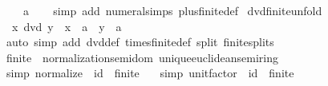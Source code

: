 \begin{isabellebody}
\ \ {\isachardoublequoteopen}{}\ {\isacharequal}{\kern0pt}\ a\isanewline
%
\isadelimproof
\ \ %
\endisadelimproof
%
\isatagproof
{}\isamarkupfalse%
\ {\isacharparenleft}{\kern0pt}simp\ add{\isacharcolon}{\kern0pt}\ numeral{\isachardot}{\kern0pt}simps\ plus{\isacharunderscore}{\kern0pt}finite{\isacharunderscore}{\kern0pt}{}{\isacharunderscore}{\kern0pt}def{\isacharparenright}{\kern0pt}%
\endisatagproof
{\isafoldproof}%
%
\isadelimproof
\isanewline
%
\endisadelimproof
\isanewline
{}\isamarkupfalse%
\ dvd{\isacharunderscore}{\kern0pt}finite{\isacharunderscore}{\kern0pt}{}{\isacharunderscore}{\kern0pt}unfold{\isacharcolon}{\kern0pt}\isanewline
\ \ {\isachardoublequoteopen}x\ dvd\ y\ {\isasymlongleftrightarrow}\ x\ {\isacharequal}{\kern0pt}\ a\ {\isasymor}\ y\ {\isacharequal}{\kern0pt}\ a\isanewline
%
\isadelimproof
\ \ %
\endisadelimproof
%
\isatagproof
{}\isamarkupfalse%
\ {\isacharparenleft}{\kern0pt}auto\ simp\ add{\isacharcolon}{\kern0pt}\ dvd{\isacharunderscore}{\kern0pt}def\ times{\isacharunderscore}{\kern0pt}finite{\isacharunderscore}{\kern0pt}{}{\isacharunderscore}{\kern0pt}def\ split{\isacharcolon}{\kern0pt}\ finite{\isacharunderscore}{\kern0pt}{}{\isachardot}{\kern0pt}splits{\isacharparenright}{\kern0pt}%
\endisatagproof
{\isafoldproof}%
%
\isadelimproof
\isanewline
%
\endisadelimproof
\isanewline
{}\isamarkupfalse%
\ finite{\isacharunderscore}{\kern0pt}{}\ {\isacharcolon}{\kern0pt}{\isacharcolon}{\kern0pt}\ {\isachardoublequoteopen}{\isacharbraceleft}{\kern0pt}normalization{\isacharunderscore}{\kern0pt}semidom{\isacharcomma}{\kern0pt}\ unique{\isacharunderscore}{\kern0pt}euclidean{\isacharunderscore}{\kern0pt}semiring{\isacharbraceright}{\kern0pt}{\isachardoublequoteclose}\ \isanewline
{}\isamarkupfalse%
\ {\isacharbrackleft}{\kern0pt}simp{\isacharbrackright}{\kern0pt}{\isacharcolon}{\kern0pt}\ {\isachardoublequoteopen}normalize\ {\isacharequal}{\kern0pt}\ {\isacharparenleft}{\kern0pt}id\ {\isacharcolon}{\kern0pt}{\isacharcolon}{\kern0pt}\ finite{\isacharunderscore}{\kern0pt}{}\ {\isasymRightarrow}\ {\isacharunderscore}{\kern0pt}{\isacharparenright}{\kern0pt}{\isachardoublequoteclose}\isanewline
{}\isamarkupfalse%
\ {\isacharbrackleft}{\kern0pt}simp{\isacharbrackright}{\kern0pt}{\isacharcolon}{\kern0pt}\ {\isachardoublequoteopen}unit{\isacharunderscore}{\kern0pt}factor\ {\isacharequal}{\kern0pt}\ {\isacharparenleft}{\kern0pt}id\ {\isacharcolon}{\kern0pt}{\isacharcolon}{\kern0pt}\ finite{\isacharunderscore}{\kern0pt}{}\ {\isasymRightarrow}\ {\isacharunderscore}{\kern0pt}{\isacharparenright}{\kern0pt}{\isachardoublequoteclose}\isanewline

\end{isabellebody}

